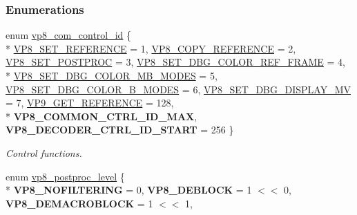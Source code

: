 \subsubsection*{Enumerations}
\begin{DoxyCompactItemize}
\item 
enum \hyperlink{group__vp8_ga8cadbc8e0af3da96ef7a2dbd4ed06599}{vp8\+\_\+com\+\_\+control\+\_\+id} \{ \\*
\hyperlink{group__vp8_gga8cadbc8e0af3da96ef7a2dbd4ed06599a7abc38d739a5ef49c36d9b2cd88e64a6}{V\+P8\+\_\+\+S\+E\+T\+\_\+\+R\+E\+F\+E\+R\+E\+N\+C\+E} = 1, 
\hyperlink{group__vp8_gga8cadbc8e0af3da96ef7a2dbd4ed06599a5375b3ea3a4867d50daee6f5971c7470}{V\+P8\+\_\+\+C\+O\+P\+Y\+\_\+\+R\+E\+F\+E\+R\+E\+N\+C\+E} = 2, 
\hyperlink{group__vp8_gga8cadbc8e0af3da96ef7a2dbd4ed06599a43e85c68bc1c1473f4a94b005a59482c}{V\+P8\+\_\+\+S\+E\+T\+\_\+\+P\+O\+S\+T\+P\+R\+O\+C} = 3, 
\hyperlink{group__vp8_gga8cadbc8e0af3da96ef7a2dbd4ed06599ab52ea7a97668b603812dfc205b0fd783}{V\+P8\+\_\+\+S\+E\+T\+\_\+\+D\+B\+G\+\_\+\+C\+O\+L\+O\+R\+\_\+\+R\+E\+F\+\_\+\+F\+R\+A\+M\+E} = 4, 
\\*
\hyperlink{group__vp8_gga8cadbc8e0af3da96ef7a2dbd4ed06599aa0d5c3eaa7cbecaf64403edc8450b060}{V\+P8\+\_\+\+S\+E\+T\+\_\+\+D\+B\+G\+\_\+\+C\+O\+L\+O\+R\+\_\+\+M\+B\+\_\+\+M\+O\+D\+E\+S} = 5, 
\hyperlink{group__vp8_gga8cadbc8e0af3da96ef7a2dbd4ed06599ae0052b9dd3c64a4bb822abafb4755a87}{V\+P8\+\_\+\+S\+E\+T\+\_\+\+D\+B\+G\+\_\+\+C\+O\+L\+O\+R\+\_\+\+B\+\_\+\+M\+O\+D\+E\+S} = 6, 
\hyperlink{group__vp8_gga8cadbc8e0af3da96ef7a2dbd4ed06599abc6aef0d7e0486d25348de217ad8441d}{V\+P8\+\_\+\+S\+E\+T\+\_\+\+D\+B\+G\+\_\+\+D\+I\+S\+P\+L\+A\+Y\+\_\+\+M\+V} = 7, 
\hyperlink{group__vp8_gga8cadbc8e0af3da96ef7a2dbd4ed06599a91e44472b21c720a9a7d087c7226d083}{V\+P9\+\_\+\+G\+E\+T\+\_\+\+R\+E\+F\+E\+R\+E\+N\+C\+E} = 128, 
\\*
{\bfseries V\+P8\+\_\+\+C\+O\+M\+M\+O\+N\+\_\+\+C\+T\+R\+L\+\_\+\+I\+D\+\_\+\+M\+A\+X}, 
{\bfseries V\+P8\+\_\+\+D\+E\+C\+O\+D\+E\+R\+\_\+\+C\+T\+R\+L\+\_\+\+I\+D\+\_\+\+S\+T\+A\+R\+T} = 256
 \}
\begin{DoxyCompactList}\small\item\em Control functions. \end{DoxyCompactList}\item 
enum \hyperlink{group__vp8_ga99557e20eb37826e6792cd8819121770}{vp8\+\_\+postproc\+\_\+level} \{ \\*
{\bfseries V\+P8\+\_\+\+N\+O\+F\+I\+L\+T\+E\+R\+I\+N\+G} = 0, 
{\bfseries V\+P8\+\_\+\+D\+E\+B\+L\+O\+C\+K} = 1 $<$$<$ 0, 
{\bfseries V\+P8\+\_\+\+D\+E\+M\+A\+C\+R\+O\+B\+L\+O\+C\+K} = 1 $<$$<$ 1, 

\end{DoxyCompactItemize}
